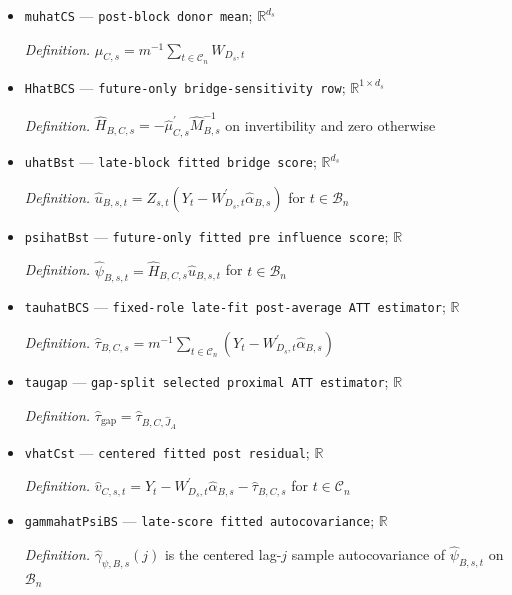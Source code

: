 \documentclass{article}
\begin{document}
\begin{itemize}
  \item \texttt{muhatCS} --- \texttt{post-\allowbreak{}block donor mean}; \(\mathbb R^{d_s}\)
  \par\smallskip\noindent\emph{Definition.} \(\widehat\mu_{C,s}=m^{-1}\sum_{t\in\mathcal C_n}W_{D_s,t}\)
  \item \texttt{HhatBCS} --- \texttt{future-\allowbreak{}only bridge-\allowbreak{}sensitivity row}; \(\mathbb R^{1\times d_s}\)
  \par\smallskip\noindent\emph{Definition.} \(\widehat H_{B,C,s}=-\widehat\mu_{C,s}^{\prime}\widehat M_{B,s}^{-1}\) on invertibility and zero otherwise
  \item \texttt{uhatBst} --- \texttt{late-\allowbreak{}block fitted bridge score}; \(\mathbb R^{d_s}\)
  \par\smallskip\noindent\emph{Definition.} \(\widehat u_{B,s,t}=Z_{s,t}(Y_t-W_{D_s,t}^{\prime}\widehat\alpha_{B,s})\) for \(t\in\mathcal B_n\)
  \item \texttt{psihatBst} --- \texttt{future-\allowbreak{}only fitted pre influence score}; \(\mathbb R\)
  \par\smallskip\noindent\emph{Definition.} \(\widehat\psi_{B,s,t}=\widehat H_{B,C,s}\widehat u_{B,s,t}\) for \(t\in\mathcal B_n\)
  \item \texttt{tauhatBCS} --- \texttt{fixed-\allowbreak{}role late-\allowbreak{}fit post-\allowbreak{}average ATT estimator}; \(\mathbb R\)
  \par\smallskip\noindent\emph{Definition.} \(\widehat\tau_{B,C,s}=m^{-1}\sum_{t\in\mathcal C_n}(Y_t-W_{D_s,t}^{\prime}\widehat\alpha_{B,s})\)
  \item \texttt{taugap} --- \texttt{gap-\allowbreak{}split selected proximal ATT estimator}; \(\mathbb R\)
  \par\smallskip\noindent\emph{Definition.} \(\widehat\tau_{\mathrm{gap}}=\widehat\tau_{B,C,\widehat J_A}\)
  \item \texttt{vhatCst} --- \texttt{centered fitted post residual}; \(\mathbb R\)
  \par\smallskip\noindent\emph{Definition.} \(\widehat v_{C,s,t}=Y_t-W_{D_s,t}^{\prime}\widehat\alpha_{B,s}-\widehat\tau_{B,C,s}\) for \(t\in\mathcal C_n\)
  \item \texttt{gammahatPsiBS} --- \texttt{late-\allowbreak{}score fitted autocovariance}; \(\mathbb R\)
  \par\smallskip\noindent\emph{Definition.} \(\widehat\gamma_{\psi,B,s}(j)\) is the centered lag-\(j\) sample autocovariance of \(\widehat\psi_{B,s,t}\) on \(\mathcal B_n\)

\end{itemize}
\end{document}
